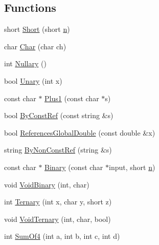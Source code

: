 \subsection*{Functions}
\begin{DoxyCompactItemize}
\item 
short \hyperlink{namespacetesting_1_1gmock__generated__actions__test_a7c442b3594b6717b8d499781a82170b2}{Short} (short \hyperlink{app_2main_8cpp_acfc02ec89670db29251fda6a66602ce2}{n})
\item 
char \hyperlink{namespacetesting_1_1gmock__generated__actions__test_aa07e216a4c9d492fb7e7c8fde949bc8f}{Char} (char ch)
\item 
int \hyperlink{namespacetesting_1_1gmock__generated__actions__test_acb3d926ebbe88529c38d95f5e61573ef}{Nullary} ()
\item 
bool \hyperlink{namespacetesting_1_1gmock__generated__actions__test_a61f0e6c3f2c07079299f1d6e1667ab92}{Unary} (int x)
\item 
const char $\ast$ \hyperlink{namespacetesting_1_1gmock__generated__actions__test_a75e901c6d28c591c53a54320a294da55}{Plus1} (const char $\ast$s)
\item 
bool \hyperlink{namespacetesting_1_1gmock__generated__actions__test_a5886409b3306d3ff2fe548f9747f1de8}{By\+Const\+Ref} (const string \&s)
\item 
bool \hyperlink{namespacetesting_1_1gmock__generated__actions__test_a3e552b41de08f0516f4b0e32fed68a61}{References\+Global\+Double} (const double \&x)
\item 
string \hyperlink{namespacetesting_1_1gmock__generated__actions__test_a2d12f232cedb11c5955db0ebb1429eb2}{By\+Non\+Const\+Ref} (string \&s)
\item 
const char $\ast$ \hyperlink{namespacetesting_1_1gmock__generated__actions__test_a3ec2020ddbfa6f2e993e0f88be1e691f}{Binary} (const char $\ast$input, short \hyperlink{app_2main_8cpp_acfc02ec89670db29251fda6a66602ce2}{n})
\item 
void \hyperlink{namespacetesting_1_1gmock__generated__actions__test_af957302d6c2b4dacd31385f2a34b529f}{Void\+Binary} (int, char)
\item 
int \hyperlink{namespacetesting_1_1gmock__generated__actions__test_a1b234626e33284c4159ea666d240d5ed}{Ternary} (int x, char y, short z)
\item 
void \hyperlink{namespacetesting_1_1gmock__generated__actions__test_a7b1b519421c70b90ea3c818d4cf565ac}{Void\+Ternary} (int, char, bool)
\item 
int \hyperlink{namespacetesting_1_1gmock__generated__actions__test_a2a5879c060adacf27c3528260172a7be}{Sum\+Of4} (int a, int b, int c, int d)

\end{DoxyCompactItemize}
